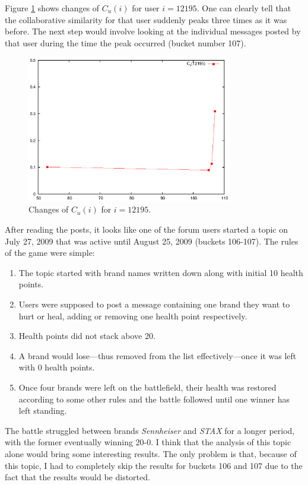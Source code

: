       Figure \ref{fig:cu_12195} shows changes of $C_u(i)$ for user $i=12195$. One can clearly tell that the collaborative similarity for that user suddenly peaks three times as it was before. The next step would involve looking at the individual messages posted by that user during the time the peak occurred (bucket number 107).
      \begin{figure}[h!]
        \centering
        \includegraphics[width=0.8\textwidth]{chapters/03_implementation/u12195}
        \caption{Changes of $C_u(i)$ for $i=12195$.}
        \label{fig:cu_12195}
      \end{figure}
      
      After reading the posts, it looks like one of the forum users started a  topic on July 27, 2009 that was active until August 25, 2009 (buckets 106-107). The rules of the game were simple:
      \begin{enumerate}
        \item The topic started with brand names written down along with initial 10 health points.
        \item Users were supposed to post a message containing one brand they want to hurt or heal, adding or removing one health point respectively.
        \item Health points did not stack above 20.
        \item A brand would lose---thus removed from the list effectively---once it was left with 0 health points.
        \item Once four brands were left on the battlefield, their health was restored according to some other rules and the battle followed until one winner has left standing.
      \end{enumerate}
      The battle struggled between brands \emph{Sennheiser} and \emph{STAX} for a longer period, with the former eventually winning 20-0. I think that the analysis of this topic alone would bring some interesting results. The only problem is that, because of this topic, I had to completely skip the results for buckets 106 and 107 due to the fact that the results would be distorted.
      
